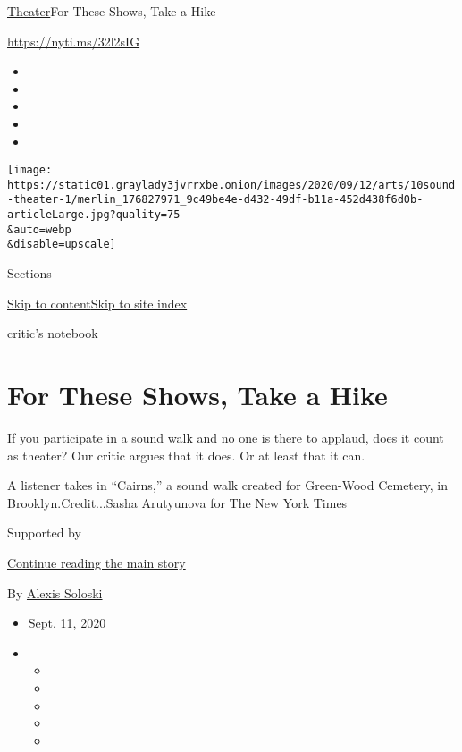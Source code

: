 \href{/section/theater}{Theater}\textbar{}For These Shows, Take a Hike

\url{https://nyti.ms/32l2sIG}

\begin{itemize}
\item
\item
\item
\item
\item
\end{itemize}

\texttt{[image: https://static01.graylady3jvrrxbe.onion/images/2020/09/12/arts/10sound-theater-1/merlin\_176827971\_9c49be4e-d432-49df-b11a-452d438f6d0b-articleLarge.jpg?quality=75\\\&auto=webp\\\&disable=upscale]}

Sections

\protect\hyperlink{site-content}{Skip to
content}\protect\hyperlink{site-index}{Skip to site index}

critic's notebook

\hypertarget{for-these-shows-take-a-hike}{%
\section{For These Shows, Take a
Hike}\label{for-these-shows-take-a-hike}}

If you participate in a sound walk and no one is there to applaud, does
it count as theater? Our critic argues that it does. Or at least that it
can.

A listener takes in ``Cairns,'' a sound walk created for Green-Wood
Cemetery, in Brooklyn.Credit...Sasha Arutyunova for The New York Times

Supported by

\protect\hyperlink{after-sponsor}{Continue reading the main story}

By \href{https://www.nytimes3xbfgragh.onion/by/alexis-soloski}{Alexis
Soloski}

\begin{itemize}
\item
  Sept. 11, 2020
\item
  \begin{itemize}
  \item
  \item
  \item
  \item
  \item
  \end{itemize}
\end{itemize}

